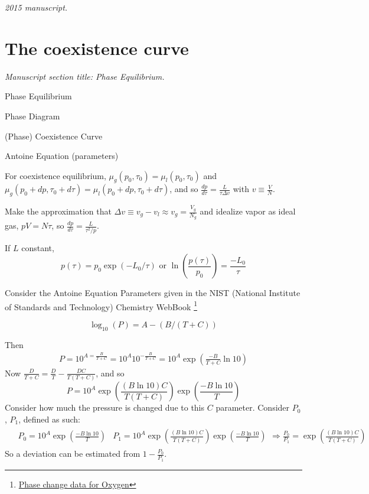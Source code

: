 \noindent\textit{2015 manuscript.}

\section{The coexistence curve}
\noindent\textit{Manuscript section title: Phase Equilibrium.}


\begin{description}
\item Phase Equilibrium
\item Phase Diagram
\item (Phase) Coexistence Curve 
\item Antoine Equation (parameters)
\end{description}


For coexistence equilibrium, $\mu_g(p_0,\tau_0) = \mu_l(p_0,\tau_0)$ and $\mu_g(p_0 + dp, \tau_0 + d\tau) = \mu_l(p_0 + dp, \tau_0+d\tau)$, and so $\frac{dp}{d\tau} = \frac{L}{ \tau \Delta v}$ with $v \equiv \frac{V}{N}$.  

Make the approximation that $\Delta v \equiv v_g - v_l \approx v_g = \frac{V_g}{N_g}$ and idealize vapor as ideal gas, $pV = N\tau$, so $\frac{dp}{d\tau} = \frac{L}{\tau^2/p}$.  

If $L$ constant, 
\begin{equation}
p(\tau) = p_0 \exp{ (-L_0 /\tau)} \text{ or } \ln{ \left( \frac{p(\tau)}{p_0} \right) } = \frac{-L_0}{\tau}
\end{equation}

Consider the Antoine Equation Parameters given in the NIST (National Institute of Standards and Technology) Chemistry WebBook \footnote{\href{http://webbook.nist.gov/cgi/cbook.cgi?ID=C7782447&Mask=4\#Thermo-Phase}{Phase change data for Oxygen}}

\begin{equation}
  \log_{10}(P) = A- (B/(T+C))
\end{equation}

Then
\[
\begin{gathered}
  P = 10^{ A = \frac{B}{T+C}} = 10^A 10^{-\frac{B}{T+C}} = 10^A \exp{ \left( \frac{-B}{T+C} \ln{10} \right) }
\end{gathered}
\]
Now $\frac{D}{T+C} = \frac{D}{T} - \frac{DC}{T(T+C)}$, and so
\[
P = 10^A \exp{ \left( \frac{ (B\ln{10} )C }{T(T+C)} \right) }\exp{ \left( \frac{-B\ln{10} }{ T} \right) }
\]
Consider how much the pressure is changed due to this $C$ parameter.  Consider $P_0$, $P_1$, defined as such:
\[
\begin{gathered}
  \begin{aligned}
    & P_0 = 10^A  \exp{ \left( \frac{-B\ln{10} }{ T} \right) }
    & P_1 = 10^A \exp{ \left( \frac{ (B\ln{10} )C }{T(T+C)} \right) }\exp{ \left( \frac{-B\ln{10} }{ T} \right) }
  \end{aligned} \Longrightarrow \frac{P_0}{P_1} = \exp{ \left( \frac{ (B\ln{10} )C }{ T(T+C) } \right)}
\end{gathered}
\]
So a deviation can be estimated from $1 - \frac{P_0}{P_1}$.  

